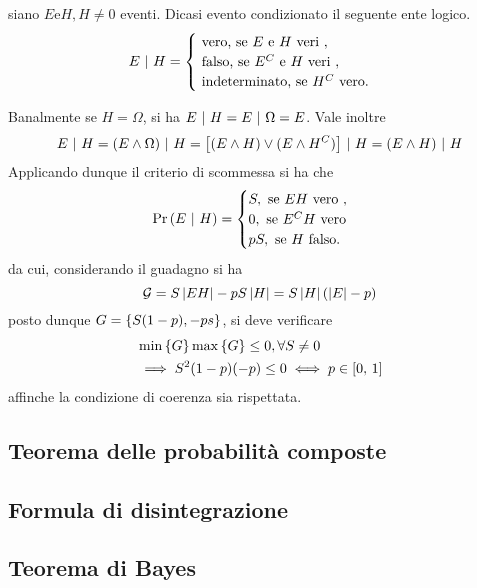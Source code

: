 \documentclass{subfiles}
\begin{document}
\begin{Definition*}
    siano \(E \text{e} H, H \neq 0\) eventi.
    Dicasi evento condizionato il seguente ente logico.
    \[E \Given H = \begin{cases}
            \text{vero, se} E \text{e} H \text{veri},      \\
            \text{falso, se} E^{C} \text{e} H \text{veri}, \\
            \text{indeterminato, se} H^{C} \text{vero.}
        \end{cases}\]
\end{Definition*}
Banalmente se \(H = \Omega\), si ha \(E \operatorname{\, | \,} H = E \operatorname{\, | \,} \Omega = E\).
Vale inoltre
\[
    E \operatorname{\, | \,} H = (E \land \Omega) \operatorname{\, | \,} H = \left[(E \land H) \lor (E \land H^{C})\right] \operatorname{\, | \,} H = (E \land H) \operatorname{\, | \,} H
\]
Applicando dunque il criterio di scommessa si ha che
\[
    \Prob{E}[H] = \begin{cases}
        S, \text{se} EH \text{vero},    \\
        0, \text{se} E^{C}H \text{vero} \\
        pS, \text{se} H \text{falso.}
    \end{cases}\]
da cui, considerando il guadagno si ha
\[
    \mathcal{G} = S \left\vert {EH} \right\vert - pS\left\vert {H} \right\vert = S\left\vert {H} \right\vert (\left\vert {E} \right\vert - p)
\]
posto dunque \(G = \Set{S(1 - p), -ps}\), si deve verificare
\[\begin{aligned}
         & \Min*{G}\Max*{G} \le 0, \forall S \neq 0                 \\
         & \implies S^{2}(1 - p)(-p) \le 0 \iff p \in \Range*{0}{1}
    \end{aligned}\]
affinche la condizione di coerenza sia rispettata.

\subsection{Teorema delle probabilità composte}


\subsection{Formula di disintegrazione}

\clearpage

\subsection{Teorema di Bayes}

\clearpage
\end{document}
